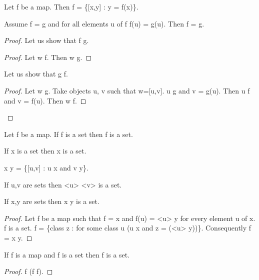 \documentclass[a4paper,draft]{amsproc}
\begin{document}
\begin{forthel}
\begin{theorem}[70]
Let f be a map. Then f = \{[x,y] : y = f(x)\}.
\end{theorem}

\begin{theorem}[71]
Assume \domain f = \domain g and for all elements u of \domain f
f(u) = g(u). Then f = g.
\end{theorem}
\begin{proof}
Let us show that f \subset g.
\begin{proof}
Let w \in f. 
Then w \in g. 
\end{proof}
Let us show that g \subset f.
\begin{proof}
Let w \in g.  
Take objects u, v such that w=[u,v].
u \in \domain g and v = g(u).
Then u \in \domain f and v = f(u).
Then w \in f. 
\end{proof} %
\end{proof}

\begin{axiom}[V]
Let f be a map. If \domain f is a set then \range f is a set.
\end{axiom}

\begin{axiom}[VI]
If x is a set then \bigcup x is a set.
\end{axiom}

\begin{definition}[72]
 x \times y = \{[u,v] : u \in x and v \in y\}.
\end{definition}

\begin {theorem}[73]
If u,v are sets then <u> \times <v> is a set.
\end{theorem}

\begin{theorem}[74]
If x,y are sets then x \times y is a set.
\end{theorem}
\begin{proof}
Let f be a map such that \domain f = x and
f(u) = <u> \times y for every element u of x.
\range f is a set.
\range f = \{class z : for some class u (u \in x and z = (<u> \times y))\}.
Consequently \bigcup \range f = x \times y.
\end{proof}

\begin{theorem}[75]
If f is a map and \domain f is a set 
then f is a set.\end{theorem}
\begin{proof}
f \subset (\domain f \times \range f).
\end{proof}


\end{forthel}
\end{document}
